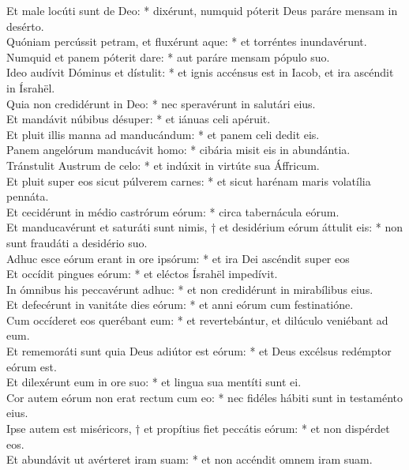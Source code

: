 {	Et male locúti sunt de Deo: * dixérunt, numquid póterit Deus paráre mensam in desérto. \\
	Quóniam percússit petram, et fluxérunt aque: * et torréntes inundavérunt. \\
	Numquid et panem póterit dare: * aut paráre mensam pópulo suo. \\
	Ideo audívit Dóminus et dístulit: * et ignis accénsus est in Iacob, et ira ascéndit in Ísrahël. \\
	Quia non credidérunt in Deo: * nec speravérunt in salutári eius. \\
	Et mandávit núbibus désuper: * et iánuas celi apéruit. \\
	Et pluit illis manna ad manducándum: * et panem celi dedit eis. \\
	Panem angelórum manducávit homo: * cibária misit eis in abundántia. \\
	Tránstulit Austrum de celo: * et indúxit in virtúte sua Áffricum. \\
	Et pluit super eos sicut púlverem carnes: * et sicut harénam maris volatília pennáta. \\
	Et cecidérunt in médio castrórum eórum: * circa tabernácula eórum. \\
	Et manducavérunt et saturáti sunt nimis, † et desidérium eórum áttulit eis: * non sunt fraudáti a desidério suo. \\
	Adhuc esce eórum erant in ore ipsórum: * et ira Dei ascéndit super eos \\
	Et occídit pingues eórum: * et eléctos Ísrahël impedívit. \\
	In ómnibus his peccavérunt adhuc: * et non credidérunt in mirabílibus eius. \\
	Et defecérunt in vanitáte dies eórum: * et anni eórum cum festinatióne. \\
	Cum occíderet eos querébant eum: * et revertebántur, et dilúculo veniébant ad eum. \\
	Et rememoráti sunt quia Deus adiútor est eórum: * et Deus excélsus redémptor eórum est. \\
	Et dilexérunt eum in ore suo: * et lingua sua mentíti sunt ei. \\
	Cor autem eórum non erat rectum cum eo: * nec fidéles hábiti sunt in testaménto eius. \\
	Ipse autem est miséricors, † et propítius fiet peccátis eórum: * et non dispérdet eos. \\
	Et abundávit ut avérteret iram suam: * et non accéndit omnem iram suam. \\
}
